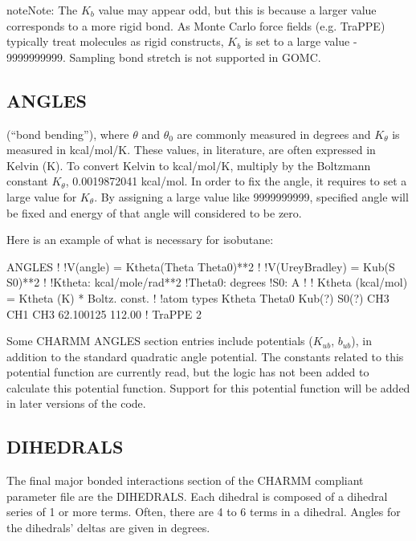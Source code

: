 \documentclass[letterpaper,10pt,english]{sphinxmanual}
\begin{document}
\begin{sphinxadmonition}{note}{Note:}
The \(K_b\) value may appear odd, but this is because a larger value corresponds to a more rigid bond. As Monte Carlo force fields (e.g. TraPPE) typically treat molecules as rigid constructs, \(K_b\) is set to a large value - 9999999999. Sampling bond stretch is not supported in GOMC.
\end{sphinxadmonition}


\subsection{ANGLES}
\label{\detokenize{input_file:angles}}
(“bond bending”), where \(\theta\) and \(\theta_0\) are commonly measured in degrees and \(K_\theta\) is measured in kcal/mol/K. These values, in literature, are often expressed in Kelvin (K). To convert Kelvin to kcal/mol/K, multiply by the Boltzmann constant \textendash{} \(K_\theta\), 0.0019872041 kcal/mol. In order to fix the angle, it requires to set a large value for \(K_\theta\). By assigning a large value like 9999999999, specified angle will be fixed and energy of that angle will considered to be zero.

Here is an example of what is necessary for isobutane:

%
\begin{sphinxVerbatim}[commandchars=\\\{\}]
ANGLES
!
!V(angle) = Ktheta(Theta \PYGZhy{} Theta0)**2
!
!V(Urey\PYGZhy{}Bradley) = Kub(S \PYGZhy{} S0)**2
!
!Ktheta:  kcal/mole/rad**2
!Theta0:  degrees
!S0:  A
!
!  Ktheta (kcal/mol) = Ktheta (K) * Boltz.  const.
!
!atom types Ktheta Theta0 Kub(?)  S0(?)
CH3 CH1 CH3 62.100125 112.00 !  TraPPE 2
\end{sphinxVerbatim}

Some CHARMM ANGLES section entries include  potentials (\(K_{ub}\), \(b_{ub}\)), in addition to the standard quadratic angle potential. The constants related to this potential function are currently read, but the logic has not been added to calculate this potential function. Support for this potential function will be added in later versions of the code.


\subsection{DIHEDRALS}
\label{\detokenize{input_file:dihedrals}}
The final major bonded interactions section of the CHARMM compliant parameter file are the DIHEDRALS. Each dihedral is composed of a dihedral series of 1 or more terms. Often, there are 4 to 6 terms in a dihedral. Angles for the dihedrals’ deltas are given in degrees.
\end{document}
